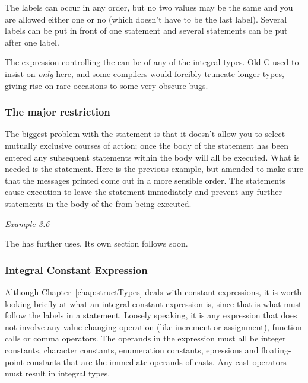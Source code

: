    The labels can occur in any order, but no two values may be the same and
    you are allowed either one or no  (which doesn't have
    to be the last label). Several labels can be put in front of one statement
    and several statements can be put after one label.


   The expression controlling the \switch{} can be of any of the
    integral types. Old C used to insist on \textit{only}
    \kint{} here, and some compilers would forcibly truncate longer
    types, giving rise on rare occasions to some very obscure bugs.


   \subsubsection{The major restriction}
    

    The biggest problem with the \switch{} statement is that it
     doesn't allow you to select mutually exclusive courses of action; once
     the body of the statement has been entered any subsequent statements
     within the body will all be executed. What is needed is the
     \kbreak{} statement. Here is the previous example, but amended
     to make sure that the messages printed come out in a more sensible order.
     The \kbreak{} statements cause execution to leave the
     \switch{} statement immediately and prevent any further
     statements in the body of the \switch{} from being
     executed.


    \begin{center}\textit{Example 3.6}\end{center}


    The \kbreak{} has further uses. Its own section follows
     soon.


   

   \subsubsection{Integral Constant Expression}
    

   Although Chapter~\ref{chap:structTypes} deals with constant expressions,
   it is worth looking briefly at what an integral constant expression is,
   since that is what must follow the \case{} labels in a
     \switch{} statement. Loosely speaking, it is any expression
     that does not involve any value-changing operation (like increment or
     assignment), function calls or comma operators. The operands in the
     expression must all be integer constants, character constants,
     enumeration constants, \sizeof{} epressions and floating-point
     constants that are the immediate operands of casts. Any cast operators
     must result in integral types.


